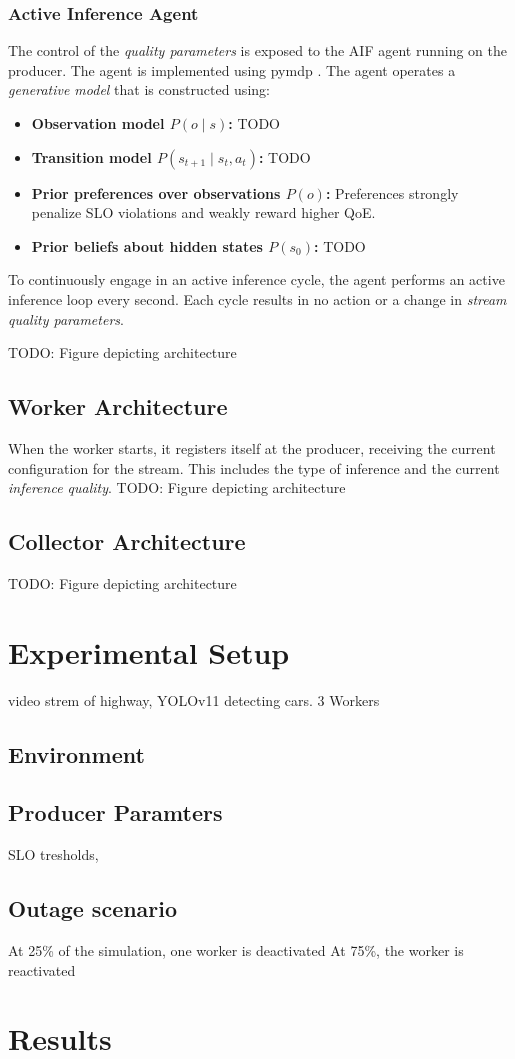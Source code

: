 \subsubsection{Active Inference Agent}
\label{sec:evaluation-implementation-active-infernce-agemt}
The control of the \textit{quality parameters} is exposed to the AIF agent running on the producer. The agent is implemented using pymdp \cite{heins_pymdp_2022}. The agent operates a \textit{generative model} that is constructed using: 
\begin{itemize}
  \item \textbf{Observation model \(P(o \mid s)\):} TODO
  \item \textbf{Transition model \(P(s_{t+1} \mid s_t,a_t)\):} TODO
  \item \textbf{Prior preferences over observations \(P(o)\):} Preferences strongly penalize SLO violations and weakly reward higher QoE. 
  \item \textbf{Prior beliefs about hidden states \(P(s_0)\):} TODO
\end{itemize}

To continuously engage in an active inference cycle, the agent performs an active inference loop every second. Each cycle results in no action or a change in \textit{stream quality parameters}. 

TODO: Figure depicting architecture
\subsection{Worker Architecture}
When the worker starts, it registers itself at the producer, receiving the current configuration for the stream. This includes the type of inference and the current \textit{inference quality}.
TODO: Figure depicting architecture
\subsection{Collector Architecture}
TODO: Figure depicting architecture


\section{Experimental Setup}
video strem of highway, YOLOv11 detecting cars. 3 Workers

\subsection{Environment}
\subsection{Producer Paramters}
SLO tresholds, 
\subsection{Outage scenario}
At 25\% of the simulation, one worker is deactivated
At 75\%, the worker is reactivated

\section{Results}